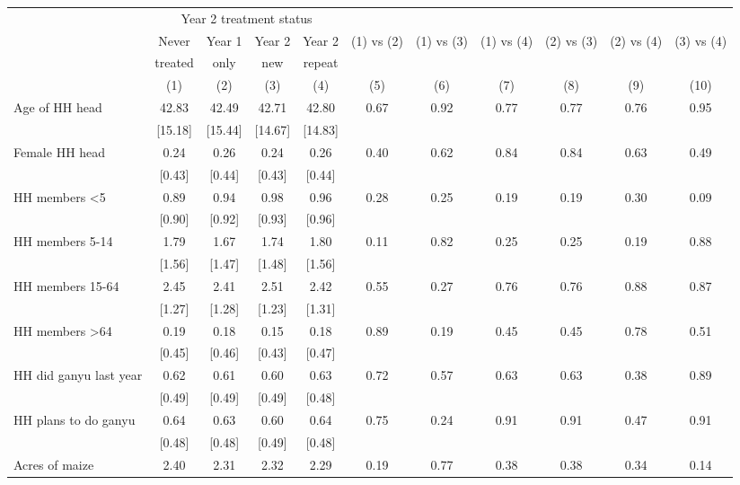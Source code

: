 \begin{tabular}{l cc cc cc cc cc}
\hline
 & \multicolumn{4}{c}{Year 2 treatment status} & & & & & & \\
 & Never & Year 1 & Year 2 & Year 2 & (1) vs (2) & (1) vs (3) & (1) vs (4) & (2) vs (3) & (2) vs (4) & (3) vs (4)   \\
 & treated & only & new & repeat & & & & & & \\ 
 & (1) & (2) & (3) & (4) & (5) & (6) & (7) & (8) & (9) & (10) \\ 
\hline
Age of HH head & 42.83    & 42.49    & 42.71    & 42.80    & 0.67 & 0.92 & 0.77 & 0.77 & 0.76 & 0.95 \\ 
 & [15.18] & [15.44] & [14.67] & [14.83] & & & & & & \\ 
Female HH head & 0.24     & 0.26     & 0.24     & 0.26     & 0.40 & 0.62 & 0.84 & 0.84 & 0.63 & 0.49 \\ 
 & [0.43] & [0.44] & [0.43] & [0.44] & & & & & & \\ 
HH members <5 & 0.89     & 0.94     & 0.98     & 0.96     & 0.28 & 0.25 & 0.19 & 0.19 & 0.30 & 0.09 \\ 
 & [0.90] & [0.92] & [0.93] & [0.96] & & & & & & \\ 
HH members 5-14 & 1.79     & 1.67     & 1.74     & 1.80     & 0.11 & 0.82 & 0.25 & 0.25 & 0.19 & 0.88 \\ 
 & [1.56] & [1.47] & [1.48] & [1.56] & & & & & & \\ 
HH members 15-64 & 2.45     & 2.41     & 2.51     & 2.42     & 0.55 & 0.27 & 0.76 & 0.76 & 0.88 & 0.87 \\ 
 & [1.27] & [1.28] & [1.23] & [1.31] & & & & & & \\ 
HH members >64 & 0.19     & 0.18     & 0.15     & 0.18     & 0.89 & 0.19 & 0.45 & 0.45 & 0.78 & 0.51 \\ 
 & [0.45] & [0.46] & [0.43] & [0.47] & & & & & & \\ 
HH did ganyu last year & 0.62     & 0.61     & 0.60     & 0.63     & 0.72 & 0.57 & 0.63 & 0.63 & 0.38 & 0.89 \\ 
 & [0.49] & [0.49] & [0.49] & [0.48] & & & & & & \\ 
HH plans to do ganyu & 0.64     & 0.63     & 0.60     & 0.64     & 0.75 & 0.24 & 0.91 & 0.91 & 0.47 & 0.91 \\ 
 & [0.48] & [0.48] & [0.49] & [0.48] & & & & & & \\ 
Acres of maize & 2.40     & 2.31     & 2.32     & 2.29     & 0.19 & 0.77 & 0.38 & 0.38 & 0.34 & 0.14 \\ 

\end{tabular}
